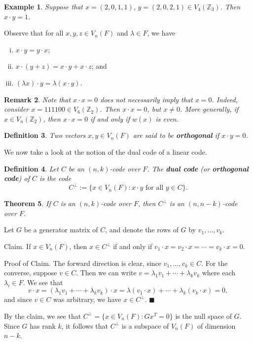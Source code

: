 \documentclass[10pt]{article}
\makeatletter
\newcommand{\Z}{\mathbb{Z}}
\theoremstyle{newstyle}
\newtheorem{thm}{Theorem}[subsection]
\newtheorem{remark}[thm]{Remark}
\newtheorem{defn}[thm]{Definition}
\newtheorem{exmp}[thm]{Example}
\newenvironment{pf}[1][\proofname]{\par
  \pushQED{\qed}%
  \normalfont \topsep0\p@\relax
  \trivlist
  \item[\hskip\labelsep\scshape
  #1\@addpunct{.}]\ignorespaces
}{%
  \popQED\endtrivlist\@endpefalse
}
\makeatother
\begin{document}
\begin{exmp}
Suppose that $x = (2, 0, 1, 1),\, y = (2, 0, 2, 1) \in V_4(\Z_3)$. Then $x \cdot y = 1$. 
\end{exmp}

Observe that for all $x, y, z \in V_n(F)$ and $\lambda \in F$, we have 
\begin{enumerate}[(i)]
    \item $x \cdot y = y \cdot x$;
    \item $x \cdot (y+z) = x \cdot y + x \cdot z$; and 
    \item $(\lambda x) \cdot y = \lambda(x \cdot y)$. 
\end{enumerate}

\begin{remark}
Note that $x \cdot x = 0$ does not necessarily imply that $x = 0$. Indeed, consider 
$x = 111100 \in V_6(\Z_2)$. Then $x \cdot x = 0$, but $x \neq 0$. More generally, if 
$x \in V_n(\Z_2)$, then $x \cdot x = 0$ if and only if $w(x)$ is even. 
\end{remark}

\begin{defn}
Two vectors $x, y \in V_n(F)$ are said to be {\bf orthogonal} if $x \cdot y = 0$. 
\end{defn}

We now take a look at the notion of the dual code of a linear code. 

\begin{defn}
Let $C$ be an $(n, k)$-code over $F$. The {\bf dual code} (or {\bf orthogonal code}) of $C$ 
is the code 
\[ C^\perp := \{x \in V_n(F) : x \cdot y \text{ for all } y \in C\}. \]
\end{defn}

\begin{thm}
If $C$ is an $(n, k)$-code over $F$, then $C^\perp$ is an $(n, n-k)$-code over $F$. 
\end{thm}
\begin{pf}
Let $G$ be a generator matrix of $C$, and denote the rows of $G$ by $v_1, \dots, v_k$. 

{\sc Claim.} If $x \in V_n(F)$, then $x \in C^\perp$ if and only if $v_1 \cdot x = 
v_2 \cdot x = \cdots = v_k \cdot x = 0$. 

{\sc Proof of Claim.} The forward direction is clear, since $v_1, \dots, v_k \in C$. For the 
converse, suppose $v \in C$. Then we can write $v = \lambda_1v_1 + \cdots + \lambda_kv_k$ 
where each $\lambda_i \in F$. We see that 
\[ v \cdot x = (\lambda_1v_1 + \cdots + \lambda_kv_k) \cdot x 
= \lambda(v_1 \cdot x) + \cdots + \lambda_k(v_k \cdot x) = 0, \]
and since $v \in C$ was arbitrary, we have $x \in C^\perp$. \hfill $\blacksquare$

By the claim, we see that $C^\perp = \{x \in V_n(F) : Gx^T = 0\}$ is the null space of $G$. 
Since $G$ has rank $k$, it follows that $C^\perp$ is a subspace of $V_n(F)$ of dimension $n-k$. 
\end{pf}
\end{document}
